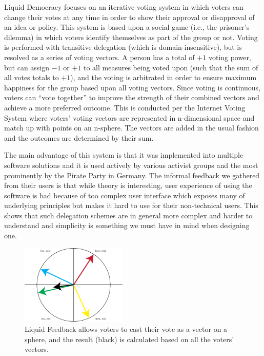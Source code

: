 \documentclass[a4paper]{acm_proc_article-sp}
\begin{document}
Liquid Democracy \cite{liquiddem} focuses on an iterative voting system in which voters can change their votes at any time in order to show
their approval or disapproval of an idea or policy.  This system is based upon a social game (i.e., the prisoner's dilemma)
in which voters identify themselves as part of the group or not.  Voting is performed with transitive delegation (which is
domain-insensitive), but is resolved as a series of voting vectors.  A person has a total of $+1$ voting power, but can
assign $-1$ or $+1$ to all measures being voted upon (such that the sum of all votes totals to $+1$), and the voting is
arbitrated in order to ensure maximum happiness for the group based upon all voting vectors.  Since voting is continuous,
voters can ``vote together'' to improve the strength of their combined vectors and achieve a more preferred outcome.  This
is conducted per the Internet Voting System where voters' voting vectors are represented in n-dimensional space and match up
with points on an n-sphere.  The vectors are added in the usual fashion and the outcomes are determined by their sum.

The main advantage of this system is that it was implemented into multiple software solutions and it is used actively by
various activist groups and the most prominently by the Pirate Party in Germany. The informal feedback we gathered from
their users is that while theory is interesting, user experience of using the software is bad because of too complex
user interface which exposes many of underlying principles but makes it hard to use for their non-technical users.
This shows that such delegation schemes are in general more complex and harder to understand and simplicity is something we
must have in mind when designing one.

\begin{figure}
\centering
\includegraphics[width=0.45\textwidth]{figures/liquidfeedback2.png}
\caption{Liquid Feedback allows voters to cast their vote as a vector on a sphere, and the result (black) is calculated based on all the voters' vectors.}
\end{figure}
\end{document}
